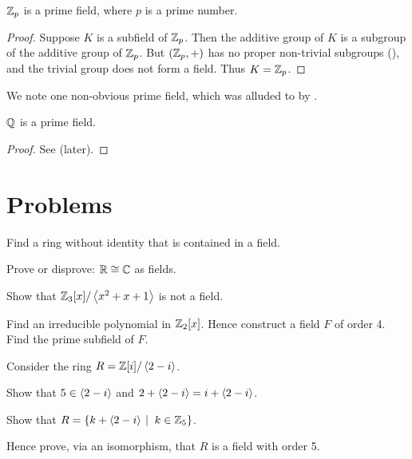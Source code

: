 \begin{theorem}
    $\mathbb{Z}_p$ is a prime field, where $p$ is a prime number.
\end{theorem}
\begin{proof}
    Suppose $K$ is a subfield of $\mathbb{Z}_p$. Then the additive group of $K$ is a subgroup of the additive group of $\mathbb{Z}_p$. But $(\mathbb{Z}_p, +)$ has no proper non-trivial subgroups (), and the trivial group does not form a field. Thus $K = \mathbb{Z}_p$.
\end{proof}

We note one non-obvious prime field, which was alluded to by .

\begin{theorem}\label{thrm-Q-is-prime-field}
    $\mathbb{Q}$ is a prime field.
\end{theorem}
\begin{proof}
    See  (later).
\end{proof}

\newpage

\section{Problems}
\begin{problem}
    Find a ring without identity that is contained in a field.
\end{problem}

\begin{problem}
    Prove or disprove: $\mathbb{R} \cong \mathbb{C}$ as fields.
\end{problem}

\begin{problem}
    Show that $\mathbb{Z}_3[x]/\left\langle x^2+x+1\right\rangle$ is not a field.
\end{problem}

\begin{problem}
    Find an irreducible polynomial in $\mathbb{Z}_2[x]$. Hence construct a field $F$ of order 4. Find the prime subfield of $F$.
\end{problem}

\begin{problem}
    Consider the ring $R = \mathbb{Z}[i] / \left\langle2-i\right\rangle$.
    \begin{partquestions}{\roman*}
        \item Show that $5 \in \left\langle2-i\right\rangle$ and $2 + \left\langle2-i\right\rangle = i + \left\langle2-i\right\rangle$.
        \item Show that $R = \{k + \princ{2-i} \vert k \in \Z_5\}$.
        \item Hence prove, via an isomorphism, that $R$ is a field with order 5.
    \end{partquestions}
\end{problem}

